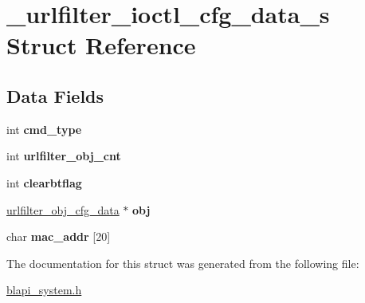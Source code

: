\hypertarget{struct__urlfilter__ioctl__cfg__data__s}{}\section{\+\_\+urlfilter\+\_\+ioctl\+\_\+cfg\+\_\+data\+\_\+s Struct Reference}
\label{struct__urlfilter__ioctl__cfg__data__s}
\subsection*{Data Fields}
\begin{DoxyCompactItemize}
\item 
\mbox{\label{struct__urlfilter__ioctl__cfg__data__s_a8acdce6b088a9d2e59f96a99f71483d1}} 
int {\bfseries cmd\+\_\+type}
\item 
\mbox{\label{struct__urlfilter__ioctl__cfg__data__s_a9fcbee76efa210a85e064c3c57b8055e}} 
int {\bfseries urlfilter\+\_\+obj\+\_\+cnt}
\item 
\mbox{\label{struct__urlfilter__ioctl__cfg__data__s_a526c970a3216aff0d2043ffee717b3aa}} 
int {\bfseries clearbtflag}
\item 
\mbox{\label{struct__urlfilter__ioctl__cfg__data__s_a4dc97202f8f6d9039b6c8828ece8f362}} 
\hyperlink{struct__urlfilter__obj__cfg__data__s}{urlfilter\+\_\+obj\+\_\+cfg\+\_\+data} $\ast$ {\bfseries obj}
\item 
\mbox{\label{struct__urlfilter__ioctl__cfg__data__s_af05ab14542329a5e4e5bc73c9854ce90}} 
char {\bfseries mac\+\_\+addr} \mbox{[}20\mbox{]}
\end{DoxyCompactItemize}


The documentation for this struct was generated from the following file\+:\begin{DoxyCompactItemize}
\item 
\hyperlink{blapi__system_8h}{blapi\+\_\+system.\+h}\end{DoxyCompactItemize}
